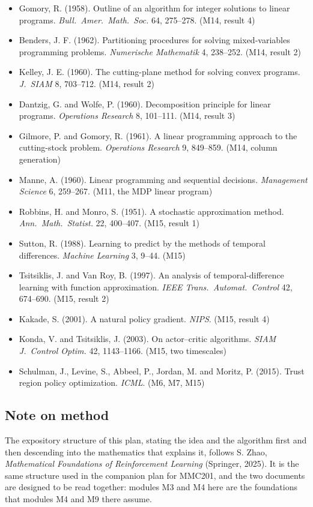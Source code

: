 \documentclass[11pt,a4paper]{article}
\begin{document}
\begin{itemize}[label={}]
programming problems. \emph{Econometrica} 28, 497--520. \hfill (M14, branch and bound)
\item[{[C26]}] Gomory, R. (1958). Outline of an algorithm for integer solutions to linear
programs. \emph{Bull.\ Amer.\ Math.\ Soc.} 64, 275--278. \hfill (M14, result 4)
\item[{[C27]}] Benders, J. F. (1962). Partitioning procedures for solving mixed-variables
programming problems. \emph{Numerische Mathematik} 4, 238--252. \hfill (M14, result 2)
\item[{[C28]}] Kelley, J. E. (1960). The cutting-plane method for solving convex programs.
\emph{J.\ SIAM} 8, 703--712. \hfill (M14, result 2)
\item[{[C29]}] Dantzig, G. and Wolfe, P. (1960). Decomposition principle for linear programs.
\emph{Operations Research} 8, 101--111. \hfill (M14, result 3)
\item[{[C30]}] Gilmore, P. and Gomory, R. (1961). A linear programming approach to the
cutting-stock problem. \emph{Operations Research} 9, 849--859.
\hfill (M14, column generation)
\item[{[C31]}] Manne, A. (1960). Linear programming and sequential decisions.
\emph{Management Science} 6, 259--267. \hfill (M11, the MDP linear program)
\item[{[C32]}] Robbins, H. and Monro, S. (1951). A stochastic approximation method.
\emph{Ann.\ Math.\ Statist.} 22, 400--407. \hfill (M15, result 1)
\item[{[C33]}] Sutton, R. (1988). Learning to predict by the methods of temporal differences.
\emph{Machine Learning} 3, 9--44. \hfill (M15)
\item[{[C34]}] Tsitsiklis, J. and Van Roy, B. (1997). An analysis of temporal-difference
learning with function approximation. \emph{IEEE Trans.\ Automat.\ Control} 42, 674--690.
\hfill (M15, result 2)
\item[{[C35]}] Kakade, S. (2001). A natural policy gradient. \emph{NIPS}.
\hfill (M15, result 4)
\item[{[C36]}] Konda, V. and Tsitsiklis, J. (2003). On actor--critic algorithms.
\emph{SIAM J.\ Control Optim.} 42, 1143--1166. \hfill (M15, two timescales)
\item[{[C37]}] Schulman, J., Levine, S., Abbeel, P., Jordan, M. and Moritz, P. (2015). Trust
region policy optimization. \emph{ICML}. \hfill (M6, M7, M15)
\end{itemize}

\subsection*{Note on method}

The expository structure of this plan, stating the idea and the algorithm first and then
descending into the mathematics that explains it, follows S. Zhao, \emph{Mathematical
Foundations of Reinforcement Learning} (Springer, 2025). It is the same structure used in the
companion plan for MMC201, and the two documents are designed to be read together: modules M3
and M4 here are the foundations that modules M4 and M9 there assume.
\end{document}
